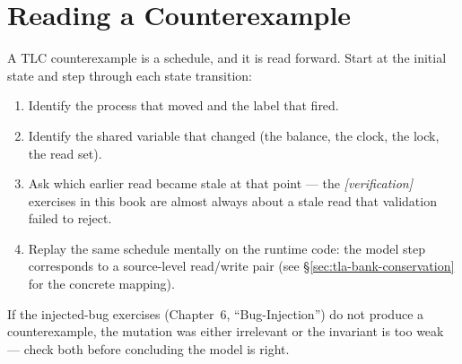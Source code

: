 \section{Reading a Counterexample}

A TLC counterexample is a schedule, and it is read forward.  Start at the
initial state and step through each state transition:

\begin{enumerate}
    \item Identify the process that moved and the label that fired.
    \item Identify the shared variable that changed (the balance, the
          clock, the lock, the read set).
    \item Ask which earlier read became stale at that point --- the
          \emph{[verification]} exercises in this book are almost always
          about a stale read that validation failed to reject.
    \item Replay the same schedule mentally on the runtime code: the model
          step corresponds to a source-level read/write pair (see
          \S\ref{sec:tla-bank-conservation} for the concrete mapping).
\end{enumerate}

If the injected-bug exercises (Chapter~6, ``Bug-Injection'') do not
produce a counterexample, the mutation was either irrelevant or the
invariant is too weak --- check both before concluding the model is right.
